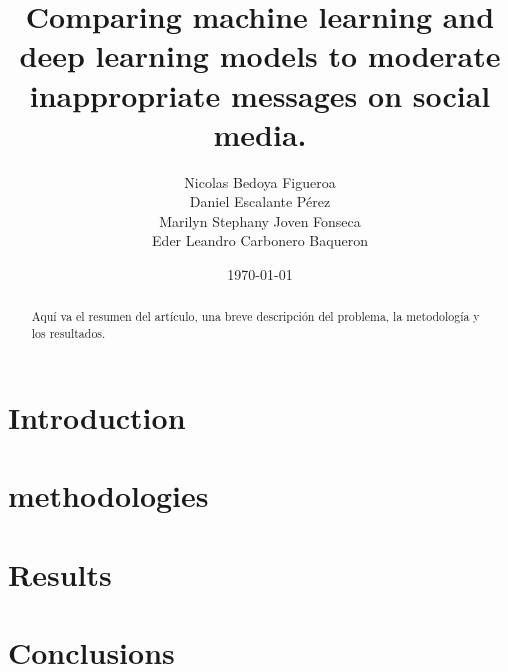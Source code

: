 \documentclass[conference]{IEEEtran}
\title{Comparing machine learning and deep learning models to moderate inappropriate messages on social media.}
\author{Nicolas Bedoya Figueroa \\
Daniel Escalante Pérez \\
Marilyn Stephany Joven Fonseca \\
Eder Leandro Carbonero Baqueron \\}
\date{\today}
\begin{document}
\maketitle
\begin{abstract}
Aquí va el resumen del artículo, una breve descripción del problema, la metodología y los resultados.
\end{abstract}

\section{Introduction}


\section{methodologies}


\section{Results}


\section{Conclusions}




\end{document}
